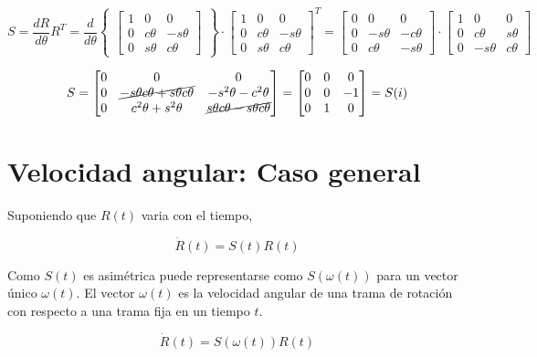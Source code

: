 \documentclass[10pt,a4paper]{article}
\begin{document}
 $$
	S = \frac{dR}{d\theta} R^T = \frac{d}{d\theta}
	\begin{Bmatrix}
	\begin{bmatrix}
		1 & 0 & 0 \\
		0 & c\theta & -s\theta\\
		0 & s\theta & c\theta
	 \end{bmatrix}
	 \end{Bmatrix}
	\cdot
	 \begin{bmatrix}
	 	1 & 0 & 0 \\
		0 & c\theta & -s\theta\\
		0 & s\theta & c\theta
	 \end{bmatrix}^T =
	\begin{bmatrix}
	 	0 & 0 & 0 \\
		0 & -s\theta & -c\theta\\
		0 & c\theta & -s\theta
	 \end{bmatrix} \cdot
	 \begin{bmatrix}
	 	1 & 0 & 0 \\
		0 & c\theta & s\theta\\
		0 & -s\theta & c\theta
	 \end{bmatrix}
 $$

 $$
	S =
	\begin{bmatrix}
		0 & 0 & 0 \\
		0 & \cancel{-s\theta c\theta + s\theta c\theta} & -s^2\theta - c^2\theta \\
		0 & c^2\theta + s^2\theta & \cancel{s\theta c\theta - s\theta c\theta}
	\end{bmatrix} =
	\begin{bmatrix}
		0 & 0 & 0 \\
		0 & 0 & -1 \\
		0 & 1 & 0
	\end{bmatrix} = S(i)
 $$
\vspace{0.5cm}
\section{Velocidad angular: Caso general}

 Suponiendo que $R(t)$ varia con el tiempo,

 $$ \dot{R}(t) = S(t)R(t)	$$

 Como $S(t)$ es asimétrica puede representarse como $S(\omega(t))$ para un vector único $\omega(t)$. El vector $\omega(t)$ es la velocidad angular de una trama de rotación con respecto a una trama fija en un tiempo $t$.

 $$ \dot{R}(t) = S(\omega(t))R(t) $$
\end{document}
